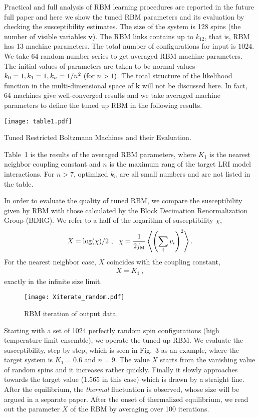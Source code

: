 \documentclass[a4paper,preprint,superscriptaddress,preprintnumbers,nofootinbib]{revtex4}
\newcommand{\Be}{\begin{eqnarray}}
\newcommand{\Ee}{\end{eqnarray}}
\begin{document}
Practical and full analysis of RBM learning procedures are
reported in the future full paper and here we show the
tuned RBM parameters and its evaluation by checking the susceptibility
estimates.
The size of the system is 128 spins (the number of visible variables
$\bm{v}$). The RBM links contains up to $k_{12}$, that is, 
RBM has 13 machine parameters.
The total number of configurations for input is $1024$.
We take 64 random number series to get averaged 
RBM machine parameters. The initial values of parameters
are taken to be normal values $k_0=1,k_1=1, k_n=1/n^2  \ ({\rm for\ } n>1)$. 
The total structure of the likelihood function in the multi-dimensional
space of $\bm{k}$ will not be discussed here.
In fact, 64 machines give well-converged results and we
take averaged machine parameters to define the tuned up RBM 
in the following results. 

\begin{table}
    \texttt{[image: table1.pdf]}
    \caption{Tuned Restricted Boltzmann Machines and their Evaluation.}       
\end{table}


Table~1 is the results of the averaged RBM parameters, where 
$K_1$ is the nearest neighbor coupling constant and 
$n$ is the maximum rang of the target LRI model interactions.
For $n>7$, optimized $k_n$ are all small numbers and are not listed 
in the table.

In order to evaluate the quality of tuned RBM, 
we compare the susceptibility given by RBM 
with those calculated by the  
Block Decimation Renormalization Group (BDRG).
We refer to a half of the logarithm of susceptibility $\chi$,
\Be
X = \log(\chi)/2\ ,\ \ 
\chi=\frac{1}{2j_{\rm M}}\left\langle \left(\sum_i v_i\right)^2 \right\rangle.
\Ee
For the nearest neighbor case, $X$ coincides with the coupling constant,
\Be
X = K_1\ ,
\Ee
exactly in the infinite size limit.


\begin{figure}[htbp]
    \texttt{[image: Xiterate\_random.pdf]}
    \caption{RBM iteration of output data.}       
    \label{fig:RMBoutput}
\end{figure}


Starting with a set of 1024 perfectly random spin configurations 
(high temperature limit ensemble), 
we operate the tuned up RBM.
We evaluate the susceptibility, step by step, which is seen in 
Fig.~3 as an example, where the target system is $K_1=0.6$ and $n=9$.
The value $X$ starts from the vanishing value of random spins
and it increases rather quickly. Finally it slowly
approaches towards the target value (1.565 in this case) which is 
drawn by a straight line.
After the equilibrium, the {\sl thermal} fluctuation is observed,
whose size will be argued in a separate paper.
After the onset of thermalized equilibrium, we read out the
parameter $X$ of the RBM by averaging over 100 iterations.
\end{document}
